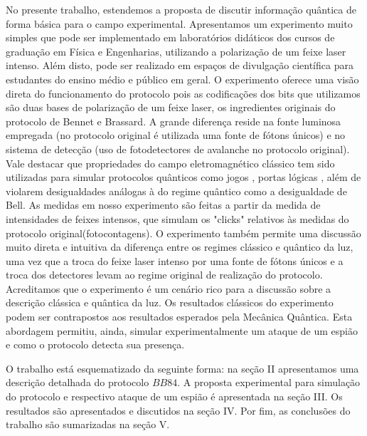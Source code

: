 \documentclass[pra, twocolumn]{revtex4}
\begin{document}
No presente trabalho, estendemos a proposta de discutir informa\c{c}\~ao qu\^antica de forma b\'asica para o campo experimental. Apresentamos um experimento muito simples que pode ser implementado em laborat\'orios did\'aticos dos cursos de gradua\c{c}\~ao em F\'isica e Engenharias, utilizando a polariza\c{c}\~ao de um feixe laser intenso. Al\'em disto, pode ser realizado em espa\c{c}os de divulga\c{c}\~ao cient\'ifica para estudantes do ensino m\'edio e p\'ublico em geral. O experimento oferece uma vis\~ao direta do funcionamento do protocolo pois as codifica\c{c}\~oes dos bits que utilizamos s\~ao duas bases de polariza\c{c}\~ao de um feixe laser, os ingredientes originais do protocolo de Bennet e Brassard. A grande diferen\c{c}a reside na fonte luminosa empregada (no protocolo original \'e utilizada uma fonte de f\'otons \'unicos) e no sistema de detec\c{c}\~ao (uso de fotodetectores de avalanche no protocolo original). Vale destacar que propriedades do campo eletromagn\'etico cl\'assico tem sido utilizadas para simular protocolos qu\^anticos como jogos \cite{jogo1, jogo2}, portas l\'ogicas \cite{pgBras}, al\'em de violarem desigualdades an\'alogas \`a do regime qu\^antico como a desigualdade de Bell\cite{bellclass, nature}. As medidas em nosso experimento s\~ao feitas a partir da medida de intensidades de feixes intensos, que simulam os "clicks" relativos \`as medidas do protocolo original(fotocontagens). O experimento tamb\'em permite uma discuss\~ao muito direta e intuitiva da diferen\c{c}a entre os regimes cl\'assico e qu\^antico da luz, uma vez que a troca do feixe laser intenso por uma fonte de f\'otons \'unicos e a troca dos detectores levam ao regime original de realiza\c{c}\~ao do protocolo. Acreditamos que o experimento \'e um cen\'ario rico para a discuss\~ao sobre a descri\c{c}\~ao cl\'assica e qu\^antica da luz. Os resultados cl\'assicos do experimento podem ser contrapostos aos resultados esperados pela Mec\^anica Qu\^antica. Esta abordagem permitiu, ainda, simular experimentalmente um ataque de um espi\~ao e como o protocolo detecta sua presen\c{c}a.  

O trabalho est\'a esquematizado da seguinte forma: na se\c{c}\~ao II apresentamos uma descri\c{c}\~ao detalhada do protocolo $BB84$. A proposta experimental para simula\c{c}\~ao do protocolo e respectivo ataque de um espi\~ao \'e apresentada na se\c{c}\~ao III. Os resultados s\~ao apresentados e discutidos na se\c{c}\~ao IV. Por fim, as conclus\~oes do trabalho s\~ao sumarizadas na se\c{c}\~ao V.
   
\end{document}
